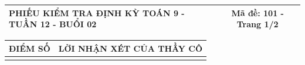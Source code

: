 \documentclass[12pt,a4paper]{article}
\begin{document}
\pagestyle{empty}
\noindent
\begin{tabularx}{\linewidth}{|X|c|}
\hline
\textbf{PHIẾU KIỂM TRA ĐỊNH KỲ TOÁN 9 - TUẦN 12 - BUỔI 02} & \textbf{Mã đề: 101 - Trang 1/2} \\
\hline
\end{tabularx}

\vspace{1.0mm}

\noindent
\begin{tabularx}{\linewidth}{|p{3.2cm}|X|}
\hline
\centering\textbf{ĐIỂM SỐ} & \centering\textbf{LỜI NHẬN XÉT CỦA THẦY CÔ} \tabularnewline
\hline
\rule{0pt}{1.8cm} & \tabularnewline
\hline
\end{tabularx}
\end{document}
